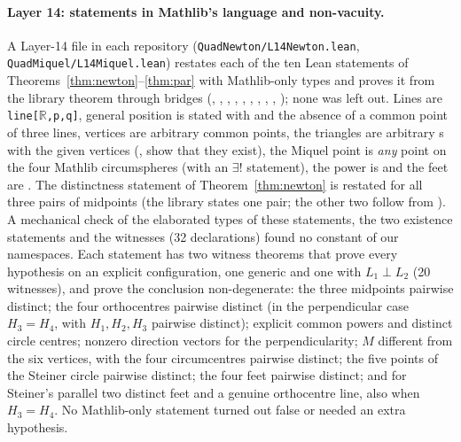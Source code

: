 \documentclass[11pt]{article}
\theoremstyle{definition}
\theoremstyle{remark}
\newcommand{\lean}[1]{\texttt{#1}}
\newcommand{\RR}{\mathbb{R}}
\begin{document}
\paragraph{Layer 14: statements in Mathlib's language and non-vacuity.} A Layer-14 file in each
repository (\lean{QuadNewton/L14Newton.lean}, \lean{QuadMiquel/L14Miquel.lean}) restates each of the ten
Lean statements of Theorems~\ref{thm:newton}--\ref{thm:par} with Mathlib-only types and proves it from
the library theorem through bridges (,
, ,
, ,
, ,
, ,
); none was left out. Lines are \lean{line[$\RR$,p,q]},
general position is stated with  and the absence of a common point of
three lines, vertices are arbitrary common points, the triangles are arbitrary
s with the given vertices (,
 show that they exist), the Miquel point is \emph{any} point on the
four Mathlib circumspheres (with an $\exists!$ statement), the power is
 and the feet are .
The distinctness statement of Theorem~\ref{thm:newton} is restated for all three pairs of midpoints
(the library states one pair; the other two follow from ). A
mechanical check of the elaborated types of these statements, the two existence statements and the
witnesses (32 declarations) found no constant of our namespaces. Each statement has two witness
theorems that prove every hypothesis on an explicit configuration, one generic and one with
$L_1\perp L_2$ (20 witnesses), and prove the conclusion non-degenerate: the three midpoints pairwise
distinct; the four orthocentres pairwise distinct (in the perpendicular case $H_3=H_4$, with $H_1,H_2,H_3$
pairwise distinct); explicit common powers and distinct circle centres; nonzero direction vectors for the
perpendicularity; $M$ different from the six vertices, with the four circumcentres pairwise distinct;
the five points of the Steiner circle pairwise distinct; the four feet pairwise distinct; and for
Steiner's parallel two distinct feet and a genuine orthocentre line, also when $H_3=H_4$. No Mathlib-only
statement turned out false or needed an extra hypothesis.
\end{document}
